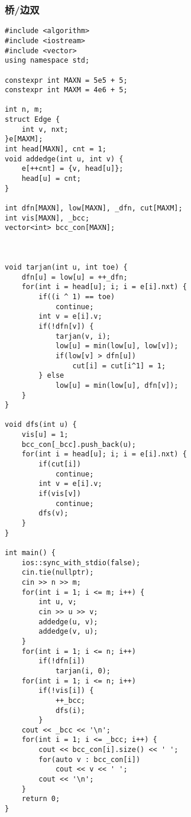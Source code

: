 \documentclass{article}
\begin{document}
	\subsubsection{桥/边双}
\begin{lstlisting}
#include <algorithm>
#include <iostream>
#include <vector>
using namespace std;

constexpr int MAXN = 5e5 + 5;
constexpr int MAXM = 4e6 + 5;

int n, m;
struct Edge {
    int v, nxt;
}e[MAXM];
int head[MAXN], cnt = 1;
void addedge(int u, int v) {
    e[++cnt] = {v, head[u]};
    head[u] = cnt;
}

int dfn[MAXN], low[MAXN], _dfn, cut[MAXM];
int vis[MAXN], _bcc;
vector<int> bcc_con[MAXN];



void tarjan(int u, int toe) {
    dfn[u] = low[u] = ++_dfn;
    for(int i = head[u]; i; i = e[i].nxt) {
        if((i ^ 1) == toe)
            continue;
        int v = e[i].v;
        if(!dfn[v]) {
            tarjan(v, i);
            low[u] = min(low[u], low[v]);
            if(low[v] > dfn[u])
                cut[i] = cut[i^1] = 1;
        } else
            low[u] = min(low[u], dfn[v]);
    }
}

void dfs(int u) {
    vis[u] = 1;
    bcc_con[_bcc].push_back(u);
    for(int i = head[u]; i; i = e[i].nxt) {
        if(cut[i])
            continue;
        int v = e[i].v;
        if(vis[v])
            continue;
        dfs(v);
    }
}

int main() {
    ios::sync_with_stdio(false);
    cin.tie(nullptr);
    cin >> n >> m;
    for(int i = 1; i <= m; i++) {
        int u, v;
        cin >> u >> v;
        addedge(u, v);
        addedge(v, u);
    }
    for(int i = 1; i <= n; i++)
        if(!dfn[i])
            tarjan(i, 0);
    for(int i = 1; i <= n; i++)
        if(!vis[i]) {
            ++_bcc;
            dfs(i);
        }
    cout << _bcc << '\n';
    for(int i = 1; i <= _bcc; i++) {
        cout << bcc_con[i].size() << ' ';
        for(auto v : bcc_con[i])
            cout << v << ' ';
        cout << '\n';
    }
    return 0;
}
\end{lstlisting}
\end{document}
